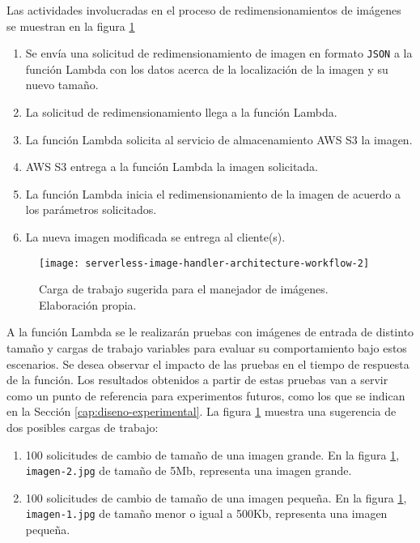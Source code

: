 Las actividades involucradas en el proceso de redimensionamientos de imágenes se muestran en la figura \ref{fig:serverless-image-handler-architecture-workflow}
\begin{enumerate}
    \item Se envía una solicitud de redimensionamiento de imagen en formato \texttt{JSON} a la función Lambda con los datos acerca de la localización de la imagen y su nuevo tamaño.
    \item La solicitud de redimensionamiento llega a la función Lambda.
    \item La función Lambda solicita al servicio de almacenamiento AWS S3 la imagen.
    \item AWS S3 entrega a la función Lambda la imagen solicitada.
    \item La función Lambda inicia el redimensionamiento de la imagen de acuerdo a los parámetros solicitados.
    \item La nueva imagen modificada se entrega al cliente(s).
\end{enumerate}

\begin{figure}[h]
  \centering
  \texttt{[image: serverless-image-handler-architecture-workflow-2]}
  \caption[Carga de trabajo sugerida para el manejador de imágenes]{Carga de trabajo sugerida para el manejador de imágenes. Elaboración propia.}
  \label{fig:serverless-image-handler-architecture-workflow}
\end{figure}


A la función Lambda se le realizarán pruebas con imágenes de entrada de distinto tamaño y cargas de trabajo variables para evaluar su comportamiento bajo estos escenarios. Se desea observar el impacto de las pruebas en el tiempo de respuesta de la función. Los resultados obtenidos a partir de estas pruebas van a servir como un punto de referencia para experimentos futuros, como los que se indican en la Sección \ref{cap:diseno-experimental}. La figura \ref{fig:serverless-image-handler-architecture-workflow} muestra una sugerencia de dos posibles cargas de trabajo: 

\begin{enumerate}
    \item 100 solicitudes de cambio de tamaño de una imagen grande. En la figura \ref{fig:serverless-image-handler-architecture-workflow}, \texttt{imagen-2.jpg} de tamaño de 5Mb, representa una imagen grande.
    \item 100 solicitudes de cambio de tamaño de una imagen pequeña. En la figura \ref{fig:serverless-image-handler-architecture-workflow}, \texttt{imagen-1.jpg} de tamaño menor o igual a 500Kb, representa una imagen pequeña.
\end{enumerate}

